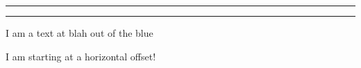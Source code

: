 \documentclass{article}
\begin{document}
\hrule
\vspace{0.1cm}
\hrule

\vspace{1cm}
\noindent
\lipsum[5]

\vspace{3cm}
\noindent
I am a text at blah \hfill out of the blue

\vspace{1cm}
\noindent \fbox{
    \parbox{\textwidth}{
            \lipsum[3]
    }
}

\hspace{5cm} I am starting at a horizontal offset!
\end{document}
